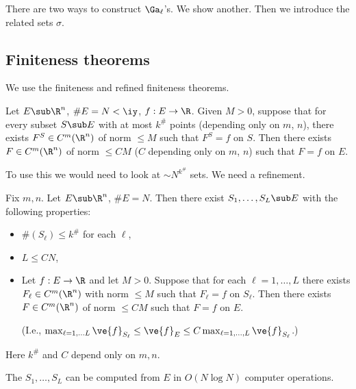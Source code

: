 There are two ways to construct $\Ga_\ell$'s. We show another. Then we introduce the related sets $\sigma$.

\subsection{Finiteness theorems}

We use the finiteness and refined finiteness theorems.
\begin{thm}\label{thm:fin}\label{t:finite}
Let $E\sub \R^n$, $\#E=N<\iy$, $f:E\to \R$. Given $M>0$, suppose that for every subset $S\sub E$ with at most $k^\#$ points (depending only on $m$, $n$), there exists $F^S\in C^m(\R^n)$ of norm $\le M$ such that $F^S=f$ on $S$. Then there exists $F\in C^m(\R^n)$ of norm $\le C M$ ($C$ depending only on $m$, $n$) such that $F=f$ on $E$.
\end{thm}
To use this we would need to look at $\sim N^{k^\#}$ sets.  %
We need a refinement. 

\begin{thm}\label{thm:rft}
Fix $m,n$. Let $E\sub \R^n$, $\#E = N$. Then there exist $S_1,\ldots ,S_L\sub E$ with the following properties:
\begin{itemize}
\item
$\#(S_\ell)\le k^\#$ for each $\ell$,
\item
$L\le CN$, 
\item
Let $f:E\to \R$ and let $M>0$. Suppose that for each $\ell=1,\ldots, L$ there exists $F_\ell\in C^m(\R^n)$ with norm $\le M$ such that $F_\ell=f$ on $S_\ell$. Then there exists $F\in C^m(\R^n)$ of norm $\le CM$ such that $F=f$ on $E$. 

(I.e., $\max_{\ell=1,\ldots L}\ve{f}_{S_{\ell}}\le \ve{f}_E\le C \max_{\ell=1,\ldots, L} \ve{f}_{S_\ell}$.)
\end{itemize}
Here $k^\#$ and $C$ depend only on $m,n$.

 The $S_1,\ldots, S_L$ can be computed from $E$ in $O(N\log N)$ computer operations.
\end{thm}

